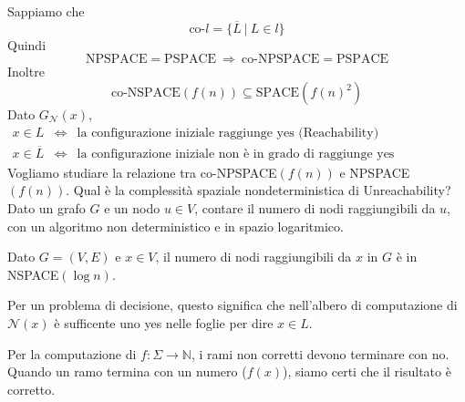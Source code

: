 Sappiamo che 
$$
    \text{co-}l = \{ \overline{L} ~|~ L\in l \}
$$
Quindi 
$$
    \text{NPSPACE}=\text{PSPACE}
    ~\Rightarrow~
    \text{co-NPSPACE}= \text{PSPACE}
$$
Inoltre
$$
    \text{co-NSPACE}(f(n)) \subseteq \text{SPACE}(f(n)^2)
$$
Dato $G_\mathcal{N}(x)$, 
\begin{eqnarray*}
    x\in L &\Leftrightarrow& \text{la configurazione iniziale raggiunge yes (Reachability)}\\
    x\in \overline{L} &\Leftrightarrow& \text{la configurazione iniziale non è in grado di raggiunge yes (Unreachability)}
\end{eqnarray*}
Vogliamo studiare la relazione tra co-NPSPACE$(f(n))$ e NPSPACE$(f(n))$. Qual è la complessità spa\-zia\-le nondeterministica di Unreachability? Dato un grafo $G$ e un nodo $u\in V$, contare il numero di nodi raggiungibili da $u$, con un algoritmo non deterministico e in spazio logaritmico.

\begin{theorem}
    Dato $G=(V,E)$ e $x\in V$, il numero di nodi raggiungibili da $x$ in $G$ è in NSPACE$(\log n)$.
\end{theorem}
Per un problema di decisione, questo significa che nell'albero di computazione di $\mathcal{N}(x)$ è sufficente uno yes nelle foglie per dire $x\in L$.

Per la computazione di $f:\Sigma\to\mathbb{N}$, i rami non corretti devono terminare con no. Quando un ramo termina con un numero ($f(x)$), siamo certi che il risultato è corretto.

